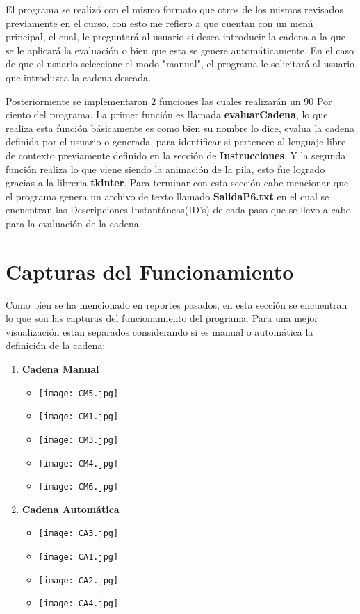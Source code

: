 \documentclass{article}
\begin{document}
	El programa se realizó con el mismo formato que otros de los mismos revisados previamente en el curso, con esto me refiero a que cuentan con un menú principal, el cual, le preguntará al usuario si desea introducir la cadena a la que se le aplicará la evaluación o bien que esta se genere automáticamente. En el caso de que el usuario seleccione el modo "manual", el programa le solicitará al usuario que introduzca la cadena deseada. 
	
	Posteriormente se implementaron 2 funciones las cuales realizarán un 90 Por ciento del programa. 
	La primer función es llamada \textbf{evaluarCadena}, lo que realiza esta función básicamente es como bien su nombre lo dice, evalua la cadena definida por el usuario o generada, para identificar si pertenece al lenguaje libre de contexto previamente definido en la sección de \textbf{Instrucciones}. Y la segunda función realiza lo que viene siendo la animación de la pila, esto fue logrado gracias a la libreria \textbf{tkinter}.
	Para terminar con esta sección cabe mencionar que el programa genera un archivo de texto llamado \textbf{SalidaP6.txt} en el cual se encuentran  las Descripciones Instantáneas(ID's) de cada paso que se llevo a cabo para la evaluación de la cadena. 
	
	\section*{Capturas del Funcionamiento}
	Como bien se ha mencionado en reportes pasados, en esta sección se encuentran lo que son las capturas del funcionamiento del programa. Para  una mejor visualización estan separados considerando si es manual o automática la definición de la cadena:
	\begin{enumerate}
		\item \textbf{Cadena Manual}
		\begin{itemize}
			\item \texttt{[image: CM5.jpg]}
			\item \texttt{[image: CM1.jpg]}
			\item \texttt{[image: CM3.jpg]}
			\item \texttt{[image: CM4.jpg]}
			\item \texttt{[image: CM6.jpg]}
		\end{itemize}		
		\item \textbf{Cadena Automática}
		\begin{itemize}
			\item \texttt{[image: CA3.jpg]}
			\item \texttt{[image: CA1.jpg]}
			\item \texttt{[image: CA2.jpg]}
			\item \texttt{[image: CA4.jpg]}
		\end{itemize}		
		
	\end{enumerate}
	
\end{document}
